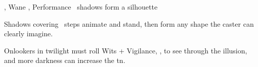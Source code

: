   {\mFire, \mAir}%
  {Wane}%
  {\detailed, \duplicated}%
  {Performance}%
  {\spellArea\ shadows form a silhouette}%
  {
    Shadows covering \spellArea\ steps animate and stand, then form any shape the caster can clearly imagine.

    \setcounter{track}{\value{spelllevel}}
    \addtocounter{track}{7}
    Onlookers in twilight must roll Wits + Vigilance, , to see through the illusion, and more darkness can increase the \gls{tn}.
  }

